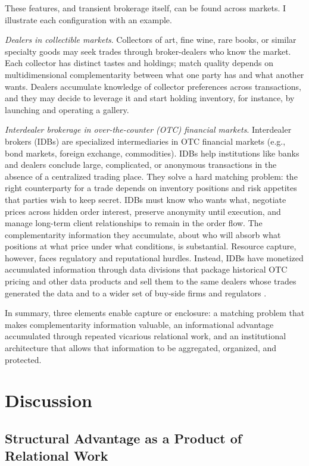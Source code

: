 \documentclass[
]{article}
\begin{document}
These features, and transient brokerage itself, can be found across markets. I illustrate each configuration with an example.

\emph{Dealers in collectible markets}. Collectors of art, fine wine, rare books, or similar specialty goods may seek trades through broker-dealers who know the market. Each collector has distinct tastes and holdings; match quality depends on multidimensional complementarity between what one party has and what another wants. Dealers accumulate knowledge of collector preferences across transactions, and they may decide to leverage it and start holding inventory, for instance, by launching and operating a gallery.

\emph{Interdealer brokerage in over-the-counter (OTC) financial markets}. Interdealer brokers (IDBs) are specialized intermediaries in OTC financial markets (e.g., bond markets, foreign exchange, commodities). IDBs help institutions like banks and dealers conclude large, complicated, or anonymous transactions in the absence of a centralized trading place. They solve a hard matching problem: the right counterparty for a trade depends on inventory positions and risk appetites that parties wish to keep secret. IDBs must know who wants what, negotiate prices across hidden order interest, preserve anonymity until execution, and manage long-term client relationships to remain in the order flow. The complementarity information they accumulate, about who will absorb what positions at what price under what conditions, is substantial. Resource capture, however, faces regulatory and reputational hurdles. Instead, IDBs have monetized accumulated information through data divisions that package historical OTC pricing and other data products and sell them to the same dealers whose trades generated the data and to a wider set of buy-side firms and regulators \autocites[see, e.g.][]{CapitalMarketsIndicative,ARA_FullReport}.

In summary, three elements enable capture or enclosure: a matching problem that makes complementarity information valuable, an informational advantage accumulated through repeated vicarious relational work, and an institutional architecture that allows that information to be aggregated, organized, and protected.

\section{Discussion}

\subsection{Structural Advantage as a Product of Relational Work}
\end{document}

